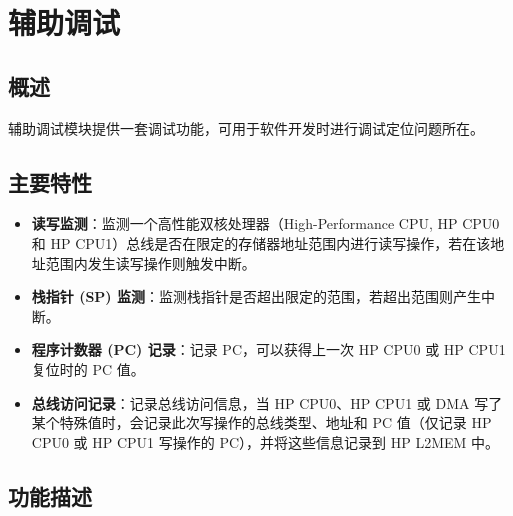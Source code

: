 \documentclass[main\_\_CN.tex]{subfiles}
\begin{document}

\ifglobal
\else
    {\let\clearpage\relax \listoftodos}
    {\let\clearpage\relax \listofdonetodos}
    \tableofcontents
\fi



\chapter{辅助调试}
\label{mod:dbgassist}
\hypertarget{dbgassist}{}

\section{概述}

辅助调试模块提供一套调试功能，可用于软件开发时进行调试定位问题所在。

\section{主要特性}
\label{sec:dbgassist-features}

\begin{itemize}
    \item {\bfseries 读写监测}：监测一个高性能双核处理器（High-Performance CPU, HP CPU0 和 HP CPU1）总线是否在限定的存储器地址范围内进行读写操作，若在该地址范围内发生读写操作则触发中断。
    \item {\bfseries 栈指针 (SP) 监测}：监测栈指针是否超出限定的范围，若超出范围则产生中断。
    \item {\bfseries 程序计数器 (PC) 记录}：记录 PC，可以获得上一次 HP CPU0 或 HP CPU1 复位时的 PC 值。
    \item {\bfseries 总线访问记录}：记录总线访问信息，当 HP CPU0、HP CPU1 或 DMA 写了某个特殊值时，会记录此次写操作的总线类型、地址和 PC 值（仅记录 HP CPU0 或 HP CPU1 写操作的 PC），并将这些信息记录到 HP L2MEM 中。
\end{itemize}



\section{功能描述}
\label{sec:dbgassist-func-descr}
\end{document}
